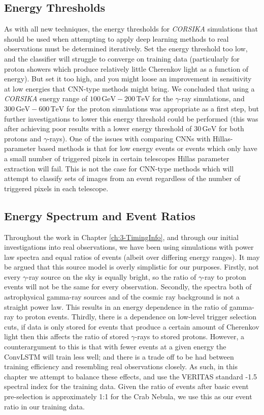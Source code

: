 \subsection{Energy Thresholds}
As with all new techniques, the energy thresholds for \textit{CORSIKA} simulations that should be used when attempting to apply deep learning methods to real observations must be determined iteratively. Set the energy threshold too low, and the classifier will struggle to converge on training data (particularly for proton showers which produce relatively little Cherenkov light as a function of energy). But set it too high, and you might loose an improvement in sensitivity at low energies that CNN-type methods might bring. We concluded that using a \textit{CORSIKA} energy range of $\mathrm{100\,GeV-200\,TeV}$ for the $\gamma$-ray simulations, and $\mathrm{300\,GeV-600\,TeV}$ for the proton simulations was appropriate as a first step, but further investigations to lower this energy threshold could be performed (this was after achieving poor results with a lower energy threshold of $\mathrm{30\,GeV}$ for both protons and $\gamma$-rays). One of the issues with comparing CNNs with Hillas-parameter based methods is that for low energy events or events which only have a small number of triggered pixels in certain telescopes Hillas parameter extraction will fail. This is not the case for CNN-type methods which will attempt to classify sets of images from an event regardless of the number of triggered pixels in each telescope.

\subsection{Energy Spectrum and Event Ratios}
Throughout the work in Chapter \ref{ch:3-TimingInfo}, and through our initial investigations into real observations, we have been using simulations with power law spectra and equal ratios of events (albeit over differing energy ranges). It may be argued that this source model is overly simplistic for our purposes. Firstly, not every $\gamma$-ray source on the sky is equally bright, so the ratio of $\gamma$-ray to proton events will not be the same for every observation. Secondly, the spectra both of astrophysical gamma-ray sources and of the cosmic ray background is not a straight power law. This results in an energy dependence in the ratio of gamma-ray to proton events. Thirdly, there is a dependence on low-level trigger selection cuts, if data is only stored for events that produce a certain amount of Cherenkov light then this affects the ratio of stored $\gamma$-rays to stored protons. However, a counterargument to this is that with fewer events at a given energy the ConvLSTM will train less well; and there is a trade off to be had between training efficiency and resembling real observations closely. As such, in this chapter we attempt to balance these effects, and use the VERITAS standard -1.5 spectral index for the training data. Given the ratio of events after basic event pre-selection is approximately 1:1 for the Crab Nebula, we use this as our event ratio in our training data.

